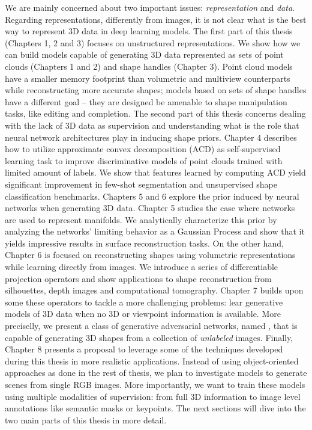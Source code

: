 We are mainly concerned about two important issues: \emph{representation} and \emph{data}.
Regarding representations, differently from images, it is not clear what is the best way
to represent 3D data in deep learning models.
The first part of this thesis (Chapters 1, 2 and 3) focuses on unstructured representations.
We show how we can build models capable of generating 3D data represented as sets of point clouds
(Chapters 1 and 2) and shape handles (Chapter 3).
Point cloud models have a smaller memory footprint than volumetric and multiview counterparts while
reconstructing more accurate shapes; models based on sets of shape handles have a different goal -- they are designed be
amenable to shape manipulation tasks, like editing and completion.
The second part of this thesis concerns dealing with the lack of 3D data as supervision and
understanding what is the role that neural network architectures play in inducing shape priors.
Chapter 4 describes how to utilize approximate convex decomposition (ACD) as self-supervised learning task
to improve discriminative models of point clouds trained with limited amount of labels.
We show that features learned by computing ACD yield significant improvement in few-shot segmentation
and unsupervised shape classification benchmarks.
Chapters 5 and 6 explore the prior induced by neural networks when generating 3D data.
Chapter 5 studies the case where networks are used to represent manifolds.
We analytically characterize this prior by analyzing the networks' limiting behavior as a Gaussian
Process and show that it yields impressive results in surface reconstruction tasks.
On the other hand, Chapter 6 is focused on reconstructing shapes using volumetric representations
while learning directly from images.
We introduce a series of differentiable projection operators and show applications to
shape reconstruction from silhouettes, depth images and computational tomography.
Chapter 7 builds upon some these operators to tackle a more challenging problems:
lear generative models of 3D data when no 3D or viewpoint information is available.
More preciselly, we present a class of generative adversarial networks, named \prgans, that is
capable of generating 3D shapes from a collection of \emph{unlabeled} images.
Finally, Chapter 8 presents a proposal to leverage some of the techniques developed during
this thesis in more realistic applications.
Instead of using object-oriented approaches as done in the rest of thesis, we plan to investigate
models to generate scenes from single RGB images.
More importantly, we want to train these models using multiple modalities of supervision:
from full 3D information to image level annotations like semantic masks or keypoints.
The next sections will dive into the two main parts of this thesis in more detail.


